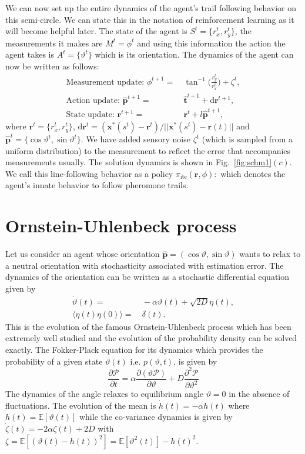 \documentclass[12pt]{article}
\def\d{\text{d}}
\def\r{\mathbf{r}}
\def\xst{\mathbf{x}^*}
\def\E{\mathbb{E}}
\def\th{\hat{\mathbf{t}}}
\def\ph{\hat{\mathbf{p}}}
\def\ite{\text{ite}}
\def\P{\mathcal{P}}
\def\theta{\vartheta}
\begin{document}
We can now set up the entire dynamics of the agent's trail following behavior on this semi-circle. We can state this
in the notation of reinforcement learning as it will become helpful later. The state of the agent
is $S^t = \{ r_x^t, r_y^t \}$, the measurements it makes are $M^t = \phi^t$ and using this information
the action the agent takes is $A^t = \{ \theta^t \}$ which is its orientation. The dynamics of
the agent can now be written as follows:
\begin{align}
    \text{Measurement update: } \phi^{t+1} = & \ \tan^{-1} \bigg( \frac{r_y^t}{r_x^t} \bigg) + \zeta^t, \\
    \text{Action update: }\ph^{t+1} =& \ \th^{t+1} + \d\r^{t+1}, \\
    \text{State update: } \r^{t+1} =& \ \r^t + l \ph^{t+1},
\end{align}
where $\r^t = \{ r_x^t, r_y^t \}$, $\d\r^t = (\xst(s^t)-\r^t)/||\xst(s^t)-\r(t)||$ and $\ph^t = \{ \cos \theta^t, \sin \theta^t \}$.
We have added sensory noise $\zeta^t$ (which is sampled from a uniform distribution) to the measurement
to reflect the error that accompanies measurements usually. The solution dynamics is shown
in Fig.~\ref{fig:schm1}$(c)$. We call this line-following behavior as a policy
$\pi_\ite(\r, \phi): $
which denotes the agent's innate behavior to follow pheromone trails.

\section{Ornstein-Uhlenbeck process}

Let us consider an agent whose orientation $\ph = ( \cos \theta, \sin \theta)$ wants to relax to a
neutral orientation with stochasticity associated with estimation error. The dynamics of the orientation
can be written as a stochastic differential equation given by
\begin{align}
    \dot{\theta}(t) =& \ - \alpha \theta(t) + \sqrt{2 D} \eta(t), \\
    \langle \eta(t) \eta(0) \rangle =& \ \delta(t).
\end{align}
This is the evolution of the famous Ornstein-Uhlenbeck process which has been extremely well studied
and the evolution of the probability density can be solved exactly. The Fokker-Plack equation for
its dynamics which provides the probability of a given state $\theta(t)$ i.e. $p(\theta, t)$, is given by
\[
    \frac{\partial \P}{\partial t} = \alpha \frac{\partial(\theta \P)}{\partial \theta }
    + D \frac{\partial^2 \P}{\partial \theta^2}
\]
The dynamics of the angle relaxes to equilibrium angle $\theta = 0$ in the absence of fluctuations.
The evolution of the mean is $\dot{h}(t) = - \alpha h(t)$ where $h(t) = \E [ \theta(t) ]$
while the co-variance dynamics is given by $\dot{\zeta}(t) = -2\alpha \zeta(t) + 2D$ with
$\zeta = \E [  {(\theta(t) - h(t))}^2 ] = \E [  \theta^2(t) ] - h{(t)}^2$.
\end{document}

